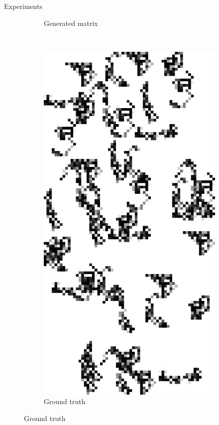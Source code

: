 \documentclass[11pt]{beamer}
\begin{document}
\begin{frame}{Experiments}
\begin{figure}[t]
\begin{subfigure}[t]{0.25\textwidth}
\caption{Generated matrix}
\label{fig:rila}
\end{subfigure}%
~
\begin{subfigure}[t]{0.25\textwidth}
\centering
\includegraphics[scale=.8]{exp_inputpatterns_2.png}
\caption{Ground truth}

\end{subfigure}
\end{figure}
\end{frame}
\end{document}
